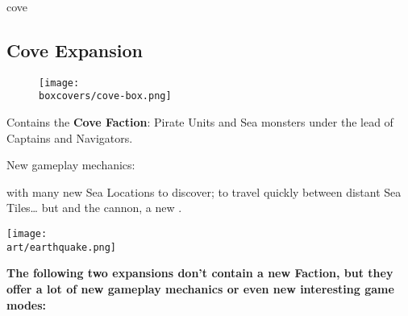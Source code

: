 \begin{multicols}{2}
\begin{expansion}[title=]{cove}
    \subsection*{\color{cove}Cove Expansion}
    \setlength\intextsep{0pt}
    \setlength\columnsep{0.8em}
    \begin{wrapfigure}{l}{0.35\textwidth}
        \texttt{[image: \\boxcovers/cove-box.png]}
    \end{wrapfigure}
    Contains the \textbf{Cove Faction}: Pirate Units and Sea monsters under the lead of Captains and Navigators.\par
    \medskip
    New gameplay mechanics:\par
    \smallskip
     with many new Sea Locations to discover;  to travel quickly between distant Sea Tiles… but  and the cannon, a new .
\end{expansion}

\begin{center}
\hfill{}\texttt{[image: \\art/earthquake.png]}
\end{center}

\end{multicols}

\textbf{The following two expansions don't contain a new Faction, but they offer a lot of new gameplay mechanics or even new interesting game modes:}

